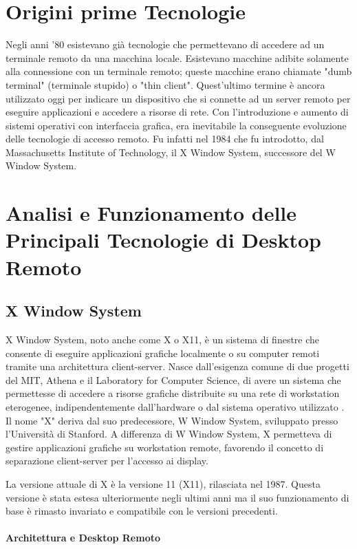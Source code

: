 \documentclass[12pt,a4paper,openright,twoside]{book}
\begin{document}
\section{Origini prime Tecnologie}
Negli anni '80 esistevano già tecnologie che permettevano di accedere ad un terminale remoto da una macchina locale. Esistevano macchine adibite solamente alla connessione con un terminale remoto; queste macchine erano chiamate "dumb terminal" (terminale stupido) o "thin client". Quest'ultimo termine è ancora utilizzato oggi per indicare un dispositivo che si connette ad un server remoto per eseguire applicazioni e accedere a risorse di rete.
Con l'introduzione e aumento di sistemi operativi con interfaccia grafica, era inevitabile la conseguente evoluzione delle tecnologie di accesso remoto. Fu infatti nel 1984 che fu introdotto, dal Massachusetts Institute of Technology, il X Window System, successore del W Window System.

\section{Analisi e Funzionamento delle Principali Tecnologie di Desktop Remoto} 

\subsection{X Window System}
X Window System, noto anche come X o X11, è un sistema di finestre che consente di eseguire applicazioni grafiche localmente o su computer remoti tramite una architettura client-server. 
Nasce dall'esigenza comune di due progetti del MIT, Athena e il Laboratory for Computer Science, di avere un sistema che permettesse di accedere a risorse grafiche distribuite su una rete di workstation eterogenee, indipendentemente dall'hardware o dal sistema operativo utilizzato \cite{Scheifler1986}. 
Il nome "X" deriva dal suo predecessore, W Window System, sviluppato presso l'Università di Stanford. A differenza di W Window System, X permetteva di gestire applicazioni grafiche su workstation remote, favorendo il concetto di separazione client-server per l'accesso ai display.

La versione attuale di X è la versione 11 (X11), rilasciata nel 1987. Questa versione è stata estesa ulteriormente negli ultimi anni ma il suo funzionamento di base è rimasto invariato e compatibile con le versioni precedenti.

\paragraph{Architettura e Desktop Remoto}
\end{document}
